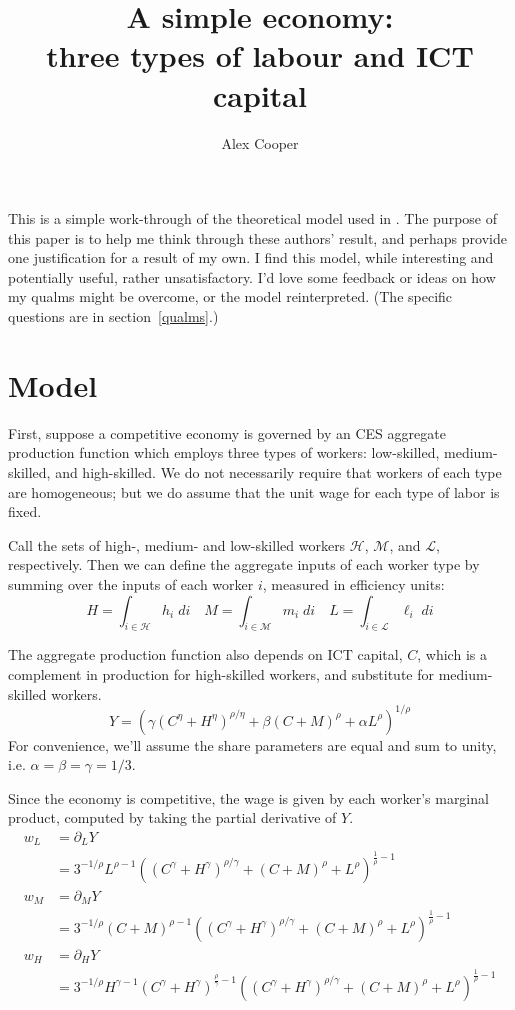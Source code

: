 \documentclass[a4paper]{article}
\title{A simple economy:\\ three types of labour and ICT capital}
\author{Alex Cooper}
\newcommand{\ELL}{\mathcal{L}}
\newcommand{\EH}{\mathcal{H}}
\newcommand{\M}{\mathcal{M}}
\begin{document}
\maketitle

This is a simple work-through of the theoretical model used in \citet{Michaels2010}. The purpose of this paper is to help me think through these authors' result, and perhaps provide one justification for a result of my own. I find this model, while interesting and potentially useful, rather unsatisfactory. I'd love some feedback or ideas on how my qualms might be overcome, or the model reinterpreted. (The specific questions are in section~\ref{qualms}.)

\section{Model}

First, suppose a competitive economy is governed by an CES aggregate production function which employs three types of workers: low-skilled, medium-skilled, and high-skilled. We do not necessarily require that workers of each type are homogeneous; but we do assume that the unit wage for each type of labor is fixed. 

Call the sets of high-, medium- and low-skilled workers $\EH$, $\M$, and $\ELL$, respectively. Then we can define the aggregate inputs of each worker type by summing over the inputs of each worker $i$, measured in efficiency units:
$$ H = \int_{i\in\EH}h_i\;di\quad 
     M = \int_{i\in\M}m_i\;di\quad
     L = \int_{i\in\ELL}\ell_i\;di $$

The aggregate production function also depends on ICT capital, $C$, which is a complement in production for high-skilled workers, and substitute for medium-skilled workers.
\begin{equation}\label{eq:prod}
 Y = \left(\gamma \left(C^{\eta }+H^{\eta }\right)^{\rho /\eta }+\beta  (C+M)^{\rho }+\alpha  L^{\rho }\right)^{1/\rho }
\end{equation}
For convenience, we'll assume the share parameters are equal and sum to unity, i.e. $\alpha=\beta=\gamma=1/3$.

Since the economy is competitive, the wage is given by each worker's marginal product, computed by taking the partial derivative of $Y$.
\begin{align*}
w_L &= \partial_LY \\
    &= 3^{-1/\rho } L^{\rho -1} \left(\left(C^{\gamma }+H^{\gamma }\right)^{\rho /\gamma }+(C+M)^{\rho }+L^{\rho }\right)^{\frac{1}{\rho }-1} \\
w_M &= \partial_MY \\
    &= 3^{-1/\rho } (C+M)^{\rho -1} \left(\left(C^{\gamma }+H^{\gamma }\right)^{\rho /\gamma }+(C+M)^{\rho }+L^{\rho }\right)^{\frac{1}{\rho }-1} \\
w_H &= \partial_HY \\
    &= 3^{-1/\rho } H^{\gamma -1} \left(C^{\gamma }+H^{\gamma }\right)^{\frac{\rho }{\gamma }-1} \left(\left(C^{\gamma }+H^{\gamma }\right)^{\rho /\gamma }+(C+M)^{\rho }+L^{\rho }\right)^{\frac{1}{\rho }-1}
\end{align*}
\end{document}

